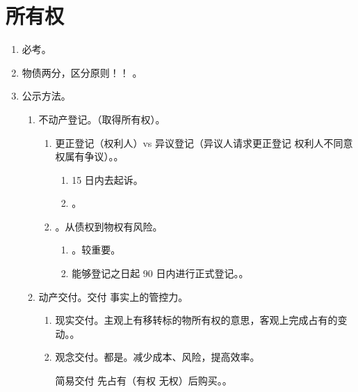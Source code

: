 \section{所有权}
\begin{enumerate}
  \item 必考。
  \item 物债两分，区分原则！！ \yjt {}。
  \item 公示方法。
        \begin{enumerate}
          \item 不动产登记。（取得所有权）。
                \begin{enumerate}
                  \item 更正登记（权利人）vs 异议登记（异议人请求更正登记 \yjt 权利人不同意 \yjt 权属有争议）。。
                        \begin{enumerate}
                          \item 15 日内去起诉。
                          \item {}。
                        \end{enumerate}
                  \item {}。从债权到物权有风险。
                        \begin{enumerate}
                          \item {}。较重要。
                          \item 能够登记之日起 90 日内进行正式登记。。
                        \end{enumerate}
                \end{enumerate}
          \item 动产交付。交付 \yjt 事实上的管控力。
                \begin{enumerate}
                  \item 现实交付。主观上有移转标的物所有权的意思，客观上完成占有的变动。。
                  \item 观念交付。都是。减少成本、风险，提高效率。
                        \begin{kk}{简易交付}
                          先占有（有权 \hz 无权）后购买。。
                        \end{kk}


\end{enumerate}
\end{enumerate}
\end{enumerate}
